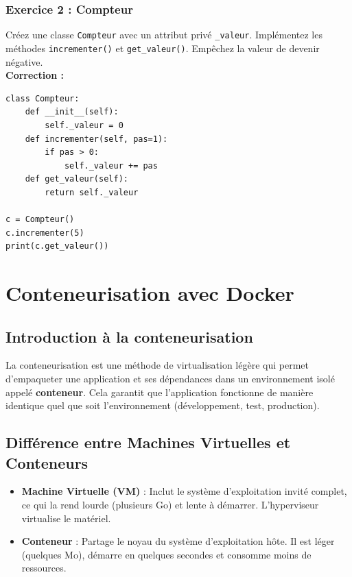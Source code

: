 \documentclass[a4paper,12pt]{article}
\begin{document}
\subsubsection{Exercice 2 : Compteur}
Créez une classe \texttt{Compteur} avec un attribut privé \texttt{\_valeur}. Implémentez les méthodes \texttt{incrementer()} et \texttt{get\_valeur()}. Empêchez la valeur de devenir négative.
\\[0.5cm]
\textbf{Correction :}
\begin{lstlisting}
class Compteur:
    def __init__(self):
        self._valeur = 0
    def incrementer(self, pas=1):
        if pas > 0:
            self._valeur += pas
    def get_valeur(self):
        return self._valeur

c = Compteur()
c.incrementer(5)
print(c.get_valeur())
\end{lstlisting}

\newpage

\section{Conteneurisation avec Docker}

\subsection{Introduction à la conteneurisation}
La conteneurisation est une méthode de virtualisation légère qui permet d'empaqueter une application et ses dépendances dans un environnement isolé appelé \textbf{conteneur}. Cela garantit que l'application fonctionne de manière identique quel que soit l'environnement (développement, test, production).

\subsection{Différence entre Machines Virtuelles et Conteneurs}
\begin{itemize}
    \item \textbf{Machine Virtuelle (VM)} : Inclut le système d'exploitation invité complet, ce qui la rend lourde (plusieurs Go) et lente à démarrer. L'hyperviseur virtualise le matériel.
    \item \textbf{Conteneur} : Partage le noyau du système d'exploitation hôte. Il est léger (quelques Mo), démarre en quelques secondes et consomme moins de ressources.
\end{itemize}
\end{document}
